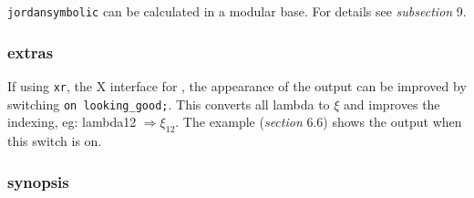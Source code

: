 {\tt jordansymbolic} can be calculated in a modular base. For details 
see {\it subsection} 9.

\subsubsection{extras}

If using {\tt xr}, the X interface for \REDUCE, the appearance of the 
output can be improved by switching {\tt on looking\_good;}. This 
converts all lambda to $\xi$ and improves the indexing, eg: lambda12 
$\Rightarrow \xi_{12}$. The example ({\it section} 6.6) shows the 
output when this switch is on.

\subsubsection{synopsis}

